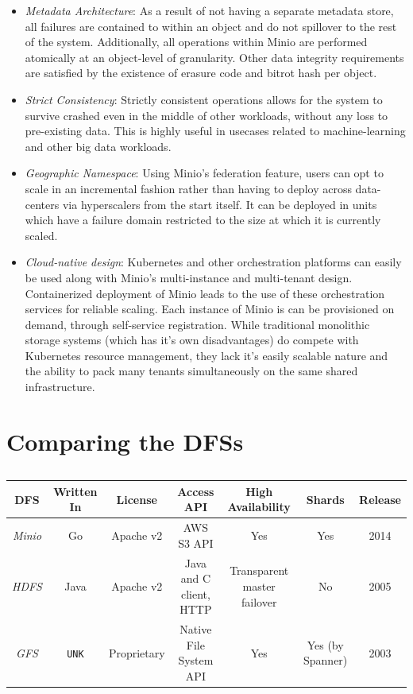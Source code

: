 \documentclass{article}
\begin{document}
\begin{itemize}
    \item \textit{Metadata Architecture}: As a result of not having a separate metadata store, all failures are contained to within an object and do not spillover to the rest of the system. Additionally, all operations within Minio are performed atomically at an object-level of granularity. Other data integrity requirements are satisfied by the existence of erasure code and bitrot hash per object. 
    \item \textit{Strict Consistency}: Strictly consistent operations allows for the system to survive crashed even in the middle of other workloads, without any loss to pre-existing data. This is highly useful in usecases related to machine-learning and other big data workloads.
    \item \textit{Geographic Namespace}: Using Minio's federation feature, users can opt to scale in an incremental fashion rather than having to deploy across data-centers via hyperscalers from the start itself. It can be deployed in units which have a failure domain restricted to the size at which it is currently scaled.
    \item \textit{Cloud-native design}: Kubernetes and other orchestration platforms can easily be used along with Minio's multi-instance and multi-tenant design. Containerized deployment of Minio leads to the use of these orchestration services for reliable scaling. Each instance of Minio is can be provisioned on demand, through self-service registration. While traditional monolithic storage systems (which has it's own disadvantages) do compete with Kubernetes resource management, they lack it's easily scalable nature and the ability to pack many tenants simultaneously on the same shared infrastructure.
    
\end{itemize}

\section{Comparing the DFSs}

\begin{table}[]
\centering
\caption{}
\label{tab:hdfsvsminio}
\begin{tabular}{|c|c|c|c|c|c|c|}
\hline
 \bf DFS &  \bf Written In &  \bf License & \bf Access API & \bf High Availability & \bf Shards & \bf Release \\
 \hline
 \it Minio & Go & Apache v2 & AWS S3 API  & Yes & Yes & 2014 \\
 \hline
 \it HDFS & Java & Apache v2 & Java and C client, HTTP  & Transparent master failover & No & 2005\\
 \hline
 \it GFS & \texttt{UNK} & Proprietary & Native File System API & Yes & Yes (by Spanner) & 2003 \\ 
 \hline
\end{tabular}
\end{table}
\end{document}
